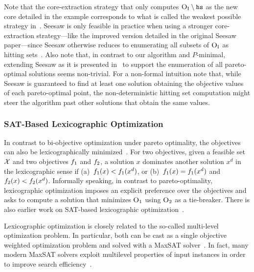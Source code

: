 Note that the core-extraction strategy that only computes $\textsc{O}_{\text{I}} \setminus \texttt{hs}$ as the new core detailed in the example corresponds to what is called the weakest possible strategy in~\textcite{DBLP:conf/cp/JanotaMSM21}.
Seesaw is only feasible in practice when using a stronger core-extraction strategy---like the improved version detailed in the original Seesaw paper---since Seesaw otherwise reduces to enumerating all subsets of $\textsc{O}_{\text{I}}$ as hitting sets~\autocite{DBLP:conf/cp/JanotaMSM21}.
Also note that, in contrast to our algorithm and $P$-minimal, extending Seesaw as it is presented in~\textcite{DBLP:conf/cp/JanotaMSM21} to support the enumeration of all pareto-optimal solutions seems non-trivial.
For a non-formal intuition note that, while Seesaw is guaranteed to find at least one solution obtaining the objective values of each pareto-optimal point, the non-deterministic hitting set computation might steer the algorithm past other solutions that obtain the same values.

\subsubsection{SAT-Based Lexicographic Optimization\label{sec:lex-opt}}

In contrast to bi-objective optimization under pareto optimality, the objectives can also be lexicographically minimized~\autocite{Ehrgott2005-1}.
For two objectives, given a feasible set $\mathcal{X}$ and two objectives $f_1$ and $f_2$, a solution $x$ dominates another solution $x^d$ in the lexicographic sense if (a)~$f_1(x) < f_1(x^d)$, or (b)~$f_1(x) = f_1(x^d)$ and $f_2(x) < f_2(x^d)$.
Informally speaking, in contrast to pareto-optimality, lexicographic optimization imposes an explicit preference over the objectives and asks to compute a solution that minimizes $\textsc{O}_1$ using $\textsc{O}_2$ as a tie-breaker.
There is also earlier work on SAT-based lexicographic optimization~\autocite{DBLP:journals/ors/EhrgottG00,DBLP:conf/ijcai/ArgelichLS09,DBLP:journals/amai/Marques-SilvaAGL11}. 

Lexicographic optimization is closely related to the so-called multi-level optimization problem.
In particular, both can be cast as a single objective weighted optimization problem and solved with a MaxSAT solver~\autocite{DBLP:conf/ijcai/ArgelichLS09,DBLP:journals/amai/Marques-SilvaAGL11}.
In fact, many modern MaxSAT solvers exploit  multilevel properties of input instances in order to improve search efficiency~\autocite{DBLP:conf/vmcai/PaxianRB21,DBLP:conf/cp/AnsoteguiBGL12}.

